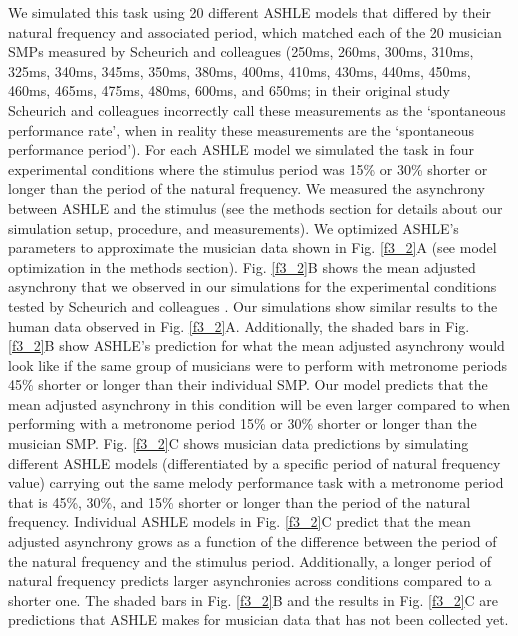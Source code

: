 \documentclass{report}
\begin{document}
We simulated this task using 20 different ASHLE models that differed by their natural frequency and associated period, which matched each of the 20 musician SMPs measured by Scheurich and colleagues \cite{scheurich2018tapping} (250ms, 260ms, 300ms, 310ms, 325ms, 340ms, 345ms, 350ms, 380ms, 400ms, 410ms, 430ms, 440ms, 450ms, 460ms, 465ms, 475ms, 480ms, 600ms, and 650ms; in their original study Scheurich and colleagues incorrectly call these measurements as the `spontaneous performance rate', when in reality these measurements are the `spontaneous performance period'). For each ASHLE model we simulated the task in four experimental conditions where the stimulus period was 15\% or 30\% shorter or longer than the period of the natural frequency. We measured the asynchrony between ASHLE and the stimulus (see the methods section for details about our simulation setup, procedure, and measurements). We optimized ASHLE's parameters to approximate the musician data shown in Fig.{} \ref{f3_2}A (see model optimization in the methods section). Fig.{} \ref{f3_2}B shows the mean adjusted asynchrony that we observed in our simulations for the experimental conditions tested by Scheurich and colleagues \cite{scheurich2018tapping}. Our simulations show similar results to the human data observed in Fig.{} \ref{f3_2}A. Additionally, the shaded bars in Fig.{} \ref{f3_2}B show ASHLE's prediction for what the mean adjusted asynchrony would look like if the same group of musicians were to perform with metronome periods 45\% shorter or longer than their individual SMP. Our model predicts that the mean adjusted asynchrony in this condition will be even larger compared to when performing with a metronome period 15\% or 30\% shorter or longer than the musician SMP. Fig.{} \ref{f3_2}C shows musician data predictions by simulating different ASHLE models (differentiated by a specific period of natural frequency value) carrying out the same melody performance task with a metronome period that is 45\%, 30\%, and 15\% shorter or longer than the period of the natural frequency. Individual ASHLE models in Fig.{} \ref{f3_2}C predict that the mean adjusted asynchrony grows as a function of the difference between the period of the natural frequency and the stimulus period. Additionally, a longer period of natural frequency predicts larger asynchronies across conditions compared to a shorter one. The shaded bars in Fig.{} \ref{f3_2}B and the results in Fig.{} \ref{f3_2}C are predictions that ASHLE makes for musician data that has not been collected yet.
\end{document}
